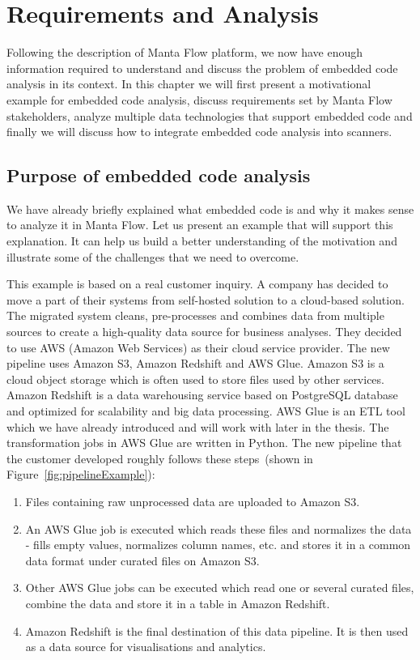  \chapter{Requirements and Analysis}

Following the description of Manta Flow platform, we now have enough information required to understand and discuss the problem of embedded code analysis in its context. In this chapter we will first present a motivational example for embedded code analysis, discuss requirements set by Manta Flow stakeholders, analyze multiple data technologies that support embedded code and finally we will discuss how to integrate embedded code analysis into scanners.

\section{Purpose of embedded code analysis}

We have already briefly explained what embedded code is and why it makes sense to analyze it in Manta Flow. Let us present an example that will support this explanation. It can help us build a better understanding of the motivation and illustrate some of the challenges that we need to overcome.
\par
This example is based on a real customer inquiry. A company has decided to move a part of their systems from self-hosted solution to a cloud-based solution. The migrated system cleans, pre-processes and combines data from multiple sources to create a high-quality data source for business analyses. They decided to use AWS (Amazon Web Services) as their cloud service provider. The new pipeline uses Amazon S3, Amazon Redshift and AWS Glue. Amazon S3 is a cloud object storage which is often used to store files used by other services. Amazon Redshift is a data warehousing service based on PostgreSQL database and optimized for scalability and big data processing. AWS Glue is an ETL tool which we have already introduced and will work with later in the thesis. The transformation jobs in AWS Glue are written in Python. The new pipeline that the customer developed roughly follows these steps~(shown in Figure~\ref{fig:pipelineExample}):
\begin{enumerate}
    \item Files containing raw unprocessed data are uploaded to Amazon S3.
    \item An AWS Glue job is executed which reads these files and normalizes the data - fills empty values, normalizes column names, etc. and stores it in a common data format under curated files on Amazon S3.
    \item Other AWS Glue jobs can be executed which read one or several curated files, combine the data and store it in a table in Amazon Redshift.
    \item Amazon Redshift is the final destination of this data pipeline. It is then used as a data source for visualisations and analytics.
\end{enumerate}

